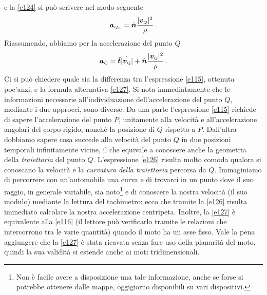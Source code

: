 \noindent e la \ref{e124} si pu\`o scrivere nel modo seguente
\begin{equation}
{\bm a}_{\scriptscriptstyle{Q}_{\scriptscriptstyle{n}}}=
{\hat{\bm n}}
{|{\bm v}_{\scriptscriptstyle{Q}}|^2 
\over{\rho}}\,.
	\label{e126}
\end{equation}
\noindent Riassumendo, abbiamo per la accelerazione del punto $Q$
\begin{equation}
{{\bm a}_{\scriptscriptstyle{Q}}} =
{\hat{\bm t}}
\dot{|{\bm v}_{\scriptscriptstyle{Q}}|}+
{\hat{\bm n}}
{|{\bm v}_{\scriptscriptstyle{Q}}|^2 
\over{\rho}}\,.
	\label{e127}
\end{equation}
\noindent Ci si pu\`o chiedere quale sia la differenza tra l'espressione \ref{e115},
ottenuta poc'anzi, e la formula alternativa \ref{e127}.
Si nota immediatamente che le informazioni necessarie
all'individuazione dell'accelerazione del punto $Q$, mediante i due approcci,
sono diverse.
Da una parte l'espressione \ref{e115} richiede di sapere l'accelerazione del
punto $P$, unitamente alla velocit\`a e all'accelerazione angolari del corpo
rigido, nonch\'e la posizione di $Q$ rispetto a $P$.
Dall'altra dobbiamo sapere cosa succede alla velocit\`a del punto $Q$ in due
posizioni temporali infinitamente vicine, il che equivale a conoscere anche
la geometria della {\em traiettoria} del punto $Q$. 
L'espressione \ref{e126} risulta molto comoda qualora si conoscano la
velocit\`a e la {\em curvatura della traiettoria} percorsa da $Q$. 
Immaginiamo di percorrere con un'automobile una curva e di trovarci in un
punto dove il suo raggio, in generale variabile, sia noto\footnote
{
Non \`e facile avere a disposizione una tale informazione,
anche se forse si potrebbe 
ottenere dalle mappe, oggigiorno disponibili su vari dispositivi.
}
e di conoscere la nostra velocit\`a
(il suo modulo) mediante la lettura del tachimetro: ecco che tramite la \ref{e126}
risulta immediato calcolare la nostra accelerazione centripeta.
Inoltre, la \ref{e127} \`e equivalente alla \ref{e116}
 (il lettore pu\`o verificarlo tramite
le relazioni che intercorrono tra le varie quantit\`a) quando il moto ha un asse fisso.
Vale la pena aggiungere che la \ref{e127}
\`e stata ricavata senza 
fare uso della planarit\`a del moto, quindi la sua validit\`a si estende
anche ai moti tridimensionali.
\newpage
\thispagestyle{empty}
\null

\endinput 


